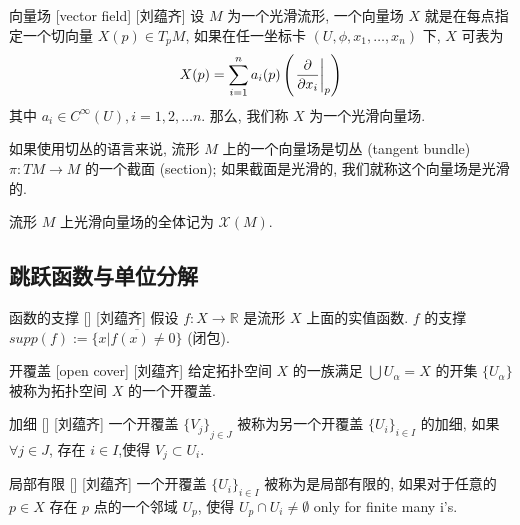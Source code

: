 \documentclass[UTF8]{ctexart}
\begin{document}
        \begin{dfn}
            []
            {向量场}
            [vector field]
            [刘蕴齐]
            设 \(M\) 为一个光滑流形, 一个向量场 \(X\) 就是在每点指定一个切向量 \(X(p) \in T_p M\), 如果在任一坐标卡 \((U,\phi,x_1,\dots,x_n)\) 下,  \(X\) 可表为
            \[
            X(p)=\sum_{i=1}^{n} a_{i}(p)\left(\left. \frac{\partial}{\partial x_{i}} \right|_{p}^{}\right)
            \]
            其中 \(a_i \in C^{\infty}(U), i = 1,2, \dots n\). 那么, 我们称  \(X\)  为一个光滑向量场. 
            
            如果使用切丛的语言来说, 流形 \(M\) 上的一个向量场是切丛 (tangent bundle)  \(\pi: TM \to M\) 的一个截面 (section); 如果截面是光滑的, 我们就称这个向量场是光滑的. 
            
            流形  \(M\)  上光滑向量场的全体记为 \(\mathcal{X}(M)\).
        \end{dfn}


    \subsection{跳跃函数与单位分解}
    
        \begin{dfn}
            []
            {函数的支撑}
            []
            [刘蕴齐]
            假设 \(f: X \to \mathbb{R}\)  是流形 \(X\) 上面的实值函数. 
             \(f\)  的支撑  \(supp(f):= \overline{\{ x | f(x) \neq 0 \}}\) (闭包).
        \end{dfn}

        \begin{dfn}
            []
            {开覆盖}
            [open cover]
            [刘蕴齐]
            给定拓扑空间 \(X\) 的一族满足 \(\bigcup U_{\alpha} = X\) 的开集 \(\{U_{\alpha} \}\) 被称为拓扑空间 \(X\) 的一个开覆盖. 
        \end{dfn}

        \begin{dfn}
            []
            {加细}
            []
            [刘蕴齐]
            一个开覆盖 \({\{V_j\}}_{j \in J}\)  被称为另一个开覆盖 \({\{U_i\}}_{i \in I}\) 的加细, 如果  \(\forall j \in J\), 存在 \(i \in I\),使得 \(V_j \subset U_i\). 
        \end{dfn}

        \begin{dfn}
            []
            {局部有限}
            []
            [刘蕴齐]
            一个开覆盖 \({\{U_i\}}_{i \in I}\) 被称为是局部有限的, 如果对于任意的 \(p \in X\) 
            存在 \(p\) 点的一个邻域 \(U_p\), 使得  \(U_p \cap U_i \neq \emptyset\)  only for finite many i's.
        \end{dfn}
\end{document}
